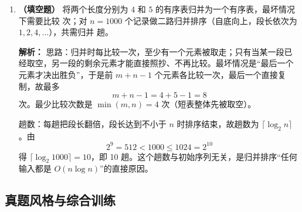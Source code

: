 \begin{enumerate}
\else \answerarea \fi

\item \textbf{（填空题）} 将两个长度分别为 $4$ 和 $5$ 的有序表归并为一个有序表，最坏情况下需要比较 \underline{\qquad} 次；对 $n=1000$ 个记录做二路归并排序（自底向上，段长依次为 $1,2,4,\ldots$），共需归并 \underline{\qquad} 趟。

\ifshowsolutions\par\noindent\textbf{解析：} 思路：归并时每比较一次，至少有一个元素被取走；只有当某一段已经取空，另一段的剩余元素才能直接照抄、不再比较。最坏情况是“最后一个元素才决出胜负”，于是前 $m+n-1$ 个元素各比较一次，最后一个直接复制，故最多
\[
m+n-1=4+5-1=8
\]
次。最少比较次数是 $\min(m,n)=4$ 次（短表整体先被取空）。

趟数：每趟把段长翻倍，段长达到不小于 $n$ 时排序结束，故趟数为 $\lceil\log_2 n\rceil$。由
\[
2^9=512<1000\leqslant 1024=2^{10}
\]
得 $\lceil\log_2 1000\rceil=10$，即 10 趟。这个趟数与初始序列无关，是归并排序“任何输入都是 $O(n\log n)$”的直接原因。

\else \answerarea \fi

\end{enumerate}

\subsection{真题风格与综合训练}

